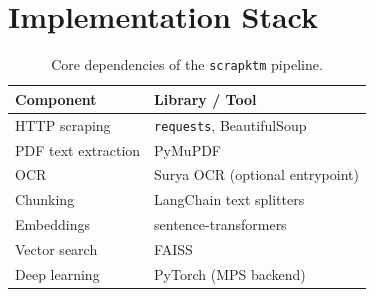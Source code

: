\section{Implementation Stack}
\begin{table}[H]
  \centering
  \caption{Core dependencies of the \texttt{scrapktm} pipeline.}
  \label{tab:dependencies}
  \begin{tabular}{@{}ll@{}}
    \toprule
    \textbf{Component} & \textbf{Library / Tool} \\
    \midrule
    HTTP scraping       & \texttt{requests}, BeautifulSoup \\
    PDF text extraction & PyMuPDF \\
    OCR                 & Surya OCR (optional entrypoint) \\
    Chunking            & LangChain text splitters \\
    Embeddings          & sentence-transformers \\
    Vector search       & FAISS \\
    Deep learning       & PyTorch (MPS backend) \\
    \bottomrule
  \end{tabular}
\end{table}
